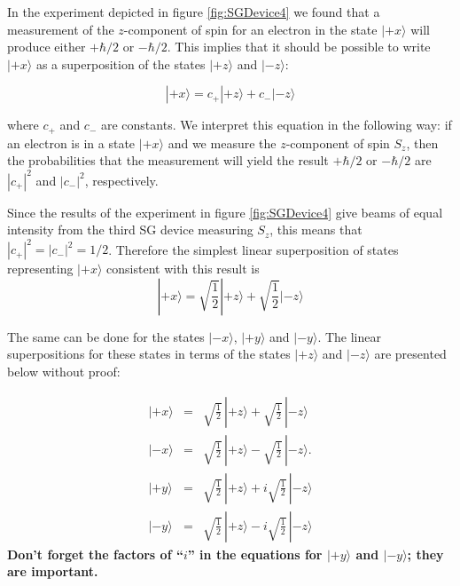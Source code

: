 In the experiment depicted in figure \ref{fig:SGDevice4} we found that a measurement of the $z$-component of spin for an electron in the state
$|\mbox{$+x$}\rangle$ will produce either $+\hbar/2$ or $-\hbar/2$.
This implies that it should be possible to write $|\mbox{$+x$}\rangle$ as
a superposition of the states $|\mbox{$+z$}\rangle$ and
$|\mbox{$-z$}\rangle$:

\begin{equation}
|\mbox{$+x$}\rangle = c_+ |\mbox{$+z$}\rangle + c_- |\mbox{$-z$}\rangle
\label{eq:superState}
\end{equation}

\noindent where $c_+$ and $c_-$ are constants.  We interpret this equation in the following way: if an electron is in a state $|\mbox{$+x$}\rangle$ and we measure the $z$-component of spin $S_z$, then the probabilities that the measurement will yield the result $+\hbar/2$ or $-\hbar/2$ are $|c_+|^2$ and $|c_-|^2$, respectively. 

Since the results of the experiment in figure \ref{fig:SGDevice4} give beams of equal intensity from the third SG device measuring $S_z$, this means that $|c_+|^2 = |c_-|^2 = 1/2$.  Therefore the simplest linear superposition of states representing $|\mbox{$+x$}\rangle$ consistent with this result is
\begin{equation}
|\mbox{$+x$}\rangle = \sqrt{\frac{1}{2}}|\mbox{$+z$}\rangle + \sqrt{\frac{1}{2}}|\mbox{$-z$}\rangle
\end{equation}

The same can be done for the states $|\mbox{$-x$}\rangle$, $|\mbox{$+y$}\rangle$ and $|\mbox{$-y$}\rangle$.  The linear superpositions for these states in terms of the states $|\mbox{$+z$}\rangle$ and $|\mbox{$-z$}\rangle$ are presented below without proof:

\begin{subequations}
\begin{eqnarray}
|\mbox{$+x$}\rangle &=&\sqrt{\frac{1}{2}} \,|\mbox{$+z$}\rangle +
  \sqrt{\frac{1}{2}} \,|\mbox{$-z$}\rangle
\label{eq:plusx}  \\
  |\mbox{$-x$}\rangle &=& \sqrt{\frac{1}{2}}
  \,|\mbox{$+z$}\rangle - \sqrt{\frac{1}{2}} \,|\mbox{$-z$}\rangle.
\label{eq:minusx}  \\
  |\mbox{$+y$}\rangle &=&\sqrt{\frac{1}{2}} \,|\mbox{$+z$}\rangle +
  i\sqrt{\frac{1}{2}} \,|\mbox{$-z$}\rangle
\label{eq:plusy}  \\
  |\mbox{$-y$}\rangle &=& \sqrt{\frac{1}{2}}
  \,|\mbox{$+z$}\rangle - i\sqrt{\frac{1}{2}} \,|\mbox{$-z$}\rangle
\label{eq:minusy}
\end{eqnarray}
\end{subequations}
{\bf Don't forget the factors of ``$i$'' in the equations for
$|\mbox{$+y$}\rangle$ and $|\mbox{$-y$}\rangle$; they are important.}


